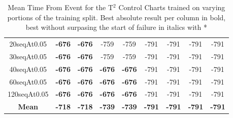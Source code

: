 \documentclass[12pt]{article}
\begin{document}
\begin{table}[h!]
\begin{tabular}{|c|cc|cc|cc|cc|}
        20seqAt0.05     & \textbf{-676} & \textbf{-676} & -759          & -759          & -791          & -791          & -791          & -791          \\
        30seqAt0.05     & \textbf{-676} & \textbf{-676} & -759          & -759          & -791          & -791          & -791          & -791          \\
        40seqAt0.05     & \textbf{-676} & \textbf{-676} & \textbf{-676} & \textbf{-676} & -791          & -791          & -791          & -791          \\
        60seqAt0.05     & \textbf{-676} & \textbf{-676} & \textbf{-676} & \textbf{-676} & -791          & -791          & -791          & -791          \\
        120seqAt0.05    & \textbf{-676} & \textbf{-676} & \textbf{-676} & \textbf{-676} & -791          & -791          & -791          & -791          \\ \hline
        \textbf{Mean}   & \textbf{-718} & \textbf{-718} & \textbf{-739} & \textbf{-739} & \textbf{-791} & \textbf{-791} & \textbf{-791} & \textbf{-791} \\ \hline
    \end{tabular}
    \caption{Mean Time From Event for the T$^2$ Control Charts trained on varying portions of the training split. Best absolute result per column in bold, best without surpasing the start of failure in italics with *}
\end{table}
\end{document}
